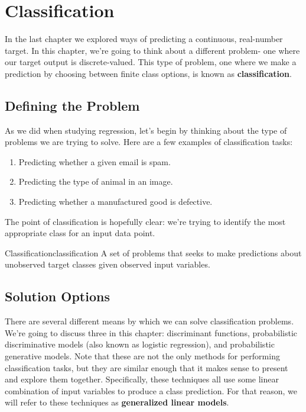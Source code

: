 \chapter{Classification}
In the last chapter we explored ways of predicting a continuous, real-number target. In this chapter, we're going to think about a different problem- one where our target output is discrete-valued. This type of problem, one where we make a prediction by choosing between finite class options, is known as \textbf{classification}.

\section{Defining the Problem}
As we did when studying regression, let's begin by thinking about the type of problems we are trying to solve. Here are a few examples of classification tasks:
\begin{enumerate}
    \item Predicting whether a given email is spam.
    \item Predicting the type of animal in an image.
    \item Predicting whether a manufactured good is defective.
\end{enumerate}
The point of classification is hopefully clear: we're trying to identify the most appropriate class for an input data point.
\begin{definition}{Classification}{classification}
A set of problems that seeks to make predictions about unobserved target classes given observed input variables.
\end{definition}

\section{Solution Options}

There are several different means by which we can solve classification problems. We're going to discuss three in this chapter: discriminant functions, probabilistic discriminative models (also known as logistic regression), and probabilistic generative models. Note that these are not the only methods for performing classification tasks, but they are similar enough that it makes sense to present and explore them together. Specifically, these techniques all use some linear combination of input variables to produce a class prediction. For that reason, we will refer to these techniques as \textbf{generalized linear models}.


